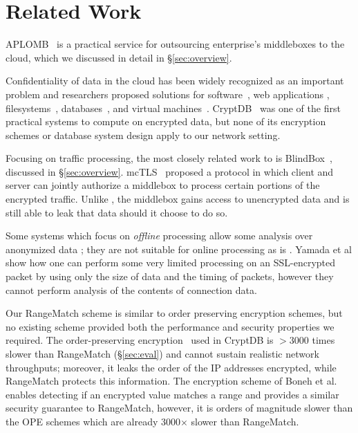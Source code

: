 
\section{Related Work}
\label{sec:related}

APLOMB~\cite{aplomb} is a practical service for outsourcing enterprise's middleboxes to the cloud, which we discussed in detail in \S\ref{sec:overview}.

Confidentiality of data in the cloud has been widely recognized as an important problem and researchers proposed solutions for software~\cite{Baumann:Haven}, web applications \cite{giffin:hails, Mylar},  filesystems~\cite{blaze:cfs, kallahalla:plutus, goh:sirius},  databases~\cite{popa:cryptdb},  and virtual machines~\cite{Zhang:CloudVisor}. 
CryptDB~\cite{popa:cryptdb} was one of the first practical systems to compute on encrypted data, but none of its encryption schemes or database system design apply to our network setting. 

Focusing on traffic processing, the most closely related work to \sys is BlindBox~\cite{blindbox}, discussed in \S\ref{sec:overview}.
mcTLS~\cite{mctls} proposed a protocol in which client and server can jointly authorize a middlebox to process certain portions of the encrypted traffic. Unlike \sys, the middlebox  gains access to unencrypted data and is still able to leak that data should it choose to do so. 

Some systems which focus on {\it offline} processing allow some analysis over anonymized data \cite{Vern:Anonymize06, Vern:Anonymize03}; they are not suitable for online processing as is \sys.
Yamada et al\cite{Yamada_IDS} show how one can perform some very limited processing on an SSL-encrypted packet by using only the size of data and the timing of packets, however they cannot perform analysis of the contents of connection data.

Our RangeMatch scheme is similar to order preserving encryption schemes, but no existing scheme provided both the performance and security properties we required.
The order-preserving encryption~\cite{boldyreva:ope, popa:mope} used in CryptDB is 
 $>3000$ times slower than RangeMatch (\S\ref{sec:eval}) and cannot sustain realistic network throughputs; moreover, it leaks the order of the IP addresses encrypted, while RangeMatch protects this information. 
The encryption scheme of Boneh et al.~\cite{BonehRange} enables detecting if an encrypted value matches a range and provides a similar security guarantee to RangeMatch, however, it is orders of magnitude slower than the OPE schemes which are already 3000$\times$ slower than RangeMatch. 

